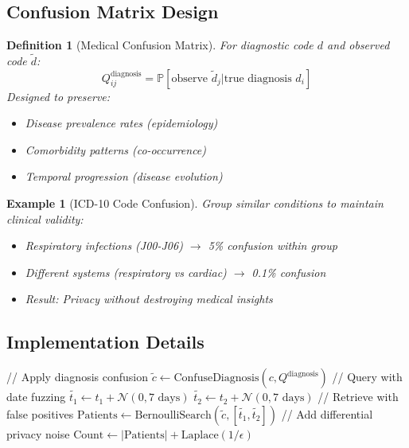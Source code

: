 \documentclass[11pt,final]{article}
\newcommand{\observed}[1]{\tilde{#1}}
\newtheorem{definition}[theorem]{Definition}
\newtheorem{example}[theorem]{Example}
\begin{document}
\subsection{Confusion Matrix Design}

\begin{definition}[Medical Confusion Matrix]
For diagnostic code $d$ and observed code $\observed{d}$:
\begin{equation}
Q^{\text{diagnosis}}_{ij} = \mathbb{P}[\text{observe } \observed{d}_j | \text{true diagnosis } d_i]
\end{equation}
Designed to preserve:
\begin{itemize}
    \item Disease prevalence rates (epidemiology)
    \item Comorbidity patterns (co-occurrence)
    \item Temporal progression (disease evolution)
\end{itemize}
\end{definition}

\begin{example}[ICD-10 Code Confusion]
Group similar conditions to maintain clinical validity:
\begin{itemize}
    \item Respiratory infections (J00-J06) $\rightarrow$ 5\% confusion within group
    \item Different systems (respiratory vs cardiac) $\rightarrow$ 0.1\% confusion
    \item Result: Privacy without destroying medical insights
\end{itemize}
\end{example}

\subsection{Implementation Details}

\begin{algorithm}[H]
\caption{Oblivious Medical Query}
// Apply diagnosis confusion\;
$\observed{c} \gets \text{ConfuseDiagnosis}(c, Q^{\text{diagnosis}})$\;
// Query with date fuzzing\;
$\observed{t_1} \gets t_1 + \mathcal{N}(0, 7 \text{ days})$\;
$\observed{t_2} \gets t_2 + \mathcal{N}(0, 7 \text{ days})$\;
// Retrieve with false positives\;
$\text{Patients} \gets \text{BernoulliSearch}(\observed{c}, [\observed{t_1}, \observed{t_2}])$\;
// Add differential privacy noise\;
$\text{Count} \gets |\text{Patients}| + \text{Laplace}(1/\epsilon)$\;
\end{algorithm}
\end{document}
